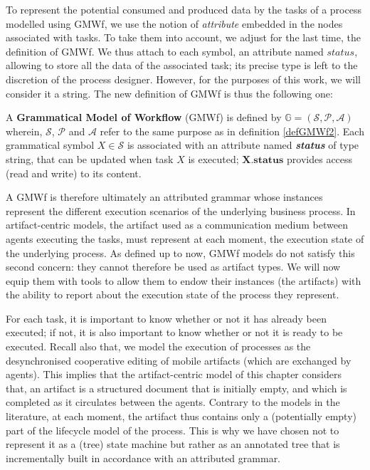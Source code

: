To represent the potential consumed and produced data by the tasks of a process modelled using GMWf, we use the notion of \textit{attribute} embedded in the nodes associated with tasks. To take them into account, we adjust for the last time, the definition of GMWf. We thus attach to each symbol, an attribute named $status$, allowing to store all the data of the associated task; its precise type is left to the discretion of the process designer. However, for the purposes of this work, we will consider it a string. The new definition of GMWf is thus the following one:
\begin{definition} 
	\label{defGMWf3}
	A \textbf{Grammatical Model of Workflow} (GMWf) is defined by $\mathbb{G}=\left(\mathcal{S},\mathcal{P},\mathcal{A}\right)$
	wherein, 
	$\mathcal{S}$, $\mathcal{P}$ and $\mathcal{A}$ refer to the same purpose as in definition \ref{defGMWf2}.
	Each grammatical symbol $X\in\mathcal{S}$ is associated with an attribute named \textbf{\textit{status}} of type string, that can be updated when task $X$ is executed; $\textbf{X.status}$ provides access (read and write) to its content.
\end{definition}

A GMWf is therefore ultimately an attributed grammar whose instances represent the different execution scenarios of the underlying business process. In artifact-centric models, the artifact used as a communication medium between agents executing the tasks, must represent at each moment, the execution state of the underlying process. As defined up to now, GMWf models do not satisfy this second concern: they cannot therefore be used as artifact types. We will now equip them with tools to allow them to endow their instances (the artifacts) with the ability to report about the execution state of the process they represent.

\label{chap3:sec:artifact-type}
For each task, it is important to know whether or not it has already been executed; if not, it is also important to know whether or not it is ready to be executed. Recall also that, we model the execution of processes as the desynchronised cooperative editing of mobile artifacts (which are exchanged by agents). This implies that the artifact-centric model of this chapter considers that, an artifact is a structured document that is initially empty, and which is completed as it circulates between the agents. Contrary to the models in the literature, at each moment, the artifact thus contains only a (potentially empty) part of the lifecycle model of the process. This is why we have chosen not to represent it as a (tree) state machine but rather as an annotated tree that is incrementally built in accordance with an attributed grammar.


